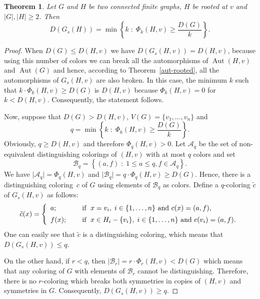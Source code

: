 \documentclass[12pt,a4paper, longbibliography]{article}
\newcommand{\Aut}{\ensuremath{\operatorname{Aut}}}
\newtheorem{theorem}{{\color{THM} Theorem}}[section]
\theoremstyle{definition}
\numberwithin{equation}{section}
\begin{document}
	
	
	
	
	
	
	
	 	\begin{theorem}\label{dist-rooted}
		Let $G$ and $H$ be two connected finite graphs, $H$ be rooted at $v$ and $\vert G\vert ,\vert H\vert\geq 2$. Then 
		\[
		D(G_s( H)) = \min\left\{k   \; :  \; \Phi_k (H,v)\geq\frac{D(G)}{k}\right\}.
		\]
	\end{theorem}
	\begin{proof}
		When $D(G)\leq D(H,v)$ we have $D(G_s(H,v))=D(H,v)$, because using this number of colors we can break all the automorphisms of $\Aut(H,v)$ and $\Aut(G)$ and hence, according to Theorem~\ref{aut-rooted}, all the automorphisms of $G_s(H,v)$ are also broken. In this case, the minimum $k$ such that  $k\cdot \Phi_k (H,v)\geq D(G)$ is $D(H,v)$ because $\Phi_k (H,v)=0$ for $k<D(H,v)$. Consequently, the statement follows.
		
		Now, suppose that $D(G)>D(H,v)$, $V(G)=\{v_1 ,\ldots, v_n \}$ and 
		\[
		q= \min\left\{k \; : \;    \Phi_k (H,v)\geq\frac{D(G)}{k}\right\}.
		\]
		Obviously, $q\geq D(H,v)$ and therefore $\Phi_q (H,v)>0$. Let $\mathcal{A}_q$ be the set of  non-equivalent distinguishing colorings of $(H,v)$ with at most $q$ colors and set
		\[
		\mathcal{B}_q=\left\{ (a,f)\; : \; 1\leq a\leq q, f\in\mathcal{A}_q \right\}.
		\]
		We have $\vert \mathcal{A}_q \vert = \Phi_q (H,v)$ and  $\vert \mathcal{B}_q \vert= q\cdot \Phi_q (H,v) \geq D(G)$. 
		Hence, there is a distinguishing coloring~$c$ of $G$ using elements of $\mathcal{B}_q$ as colors. Define a $q$-coloring $\tilde{c}$ of $G_s(H,v)$ as follows:
		\[
		\tilde{c}(x)=\left\{ \begin{array}{lll}
			a; && \textnormal{ if  }\; x=v_i,\; i\in \{1,\ldots,n\}\textnormal{ and } c(x) = (a,f),\\[5pt]
			f(x); &&  \textnormal{ if  } \;  x\in H_i -  \{v_i\},\; i\in \{1,\ldots,n\} \textnormal{ and } c(v_i)=(a,f).
		\end{array}\right.
		\]
		One can easily see that $\tilde{c}$ is a distinguishing coloring, which means that $D(G_s(H,v))\leq q$. 
		
		On the other hand, if $r<q$, then $\vert \mathcal{B}_r \vert =r\cdot \Phi_r (H,v)<D(G)$ which means that any coloring of $G$ with elements of $\mathcal{B}_r$ cannot be distinguishing. Therefore, there is no $r$-coloring which breaks both symmetries in copies of $(H,v)$ and symmetries in $G$. Consequently, $D(G_s(H,v))\geq q$.
	\end{proof}
	
\end{document}
